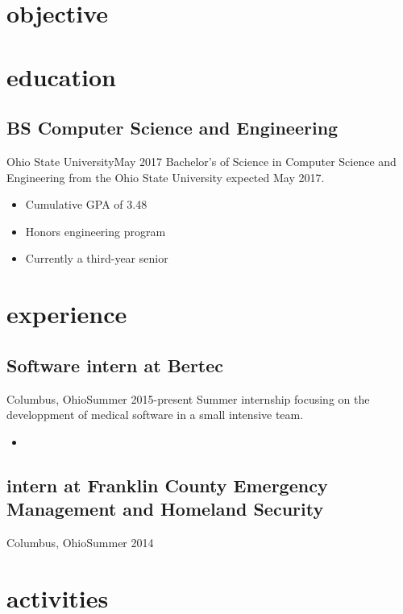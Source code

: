 \documentclass[letterpaper]{cv}
\begin{document}
	\author{Brandon A. Moore}
	\maketitle
	
	\section{objective}
		
	\section{education}
		\subsection{BS Computer Science and Engineering}{Ohio State University}{May 2017}
			Bachelor's of Science in Computer Science and Engineering from the Ohio State University expected May 2017.
			\begin{itemize}
				\item Cumulative GPA of 3.48
				\item Honors engineering program
				\item Currently a third-year senior
			\end{itemize}

	\section{experience}
		\subsection{Software intern at Bertec}{Columbus, Ohio}{Summer 2015-present}
			Summer internship focusing on the developpment of medical software in a small intensive team.
			\begin{itemize}
				\item 
			\end{itemize}
	
		\subsection{intern at Franklin County Emergency\\ Management and Homeland Security}{Columbus, Ohio}{Summer 2014}

	\section{activities}
\end{document}
